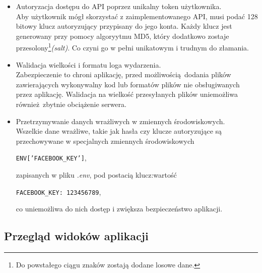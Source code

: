     \begin{itemize}
      \item Autoryzacja dostępu do API poprzez unikalny token użytkownika.\\
      Aby użytkownik mógł skorzystać z zaimplementowanego API, musi podać 128 bitowy klucz autoryzujący przypisany do jego konta. Każdy klucz jest generowany przy pomocy algoryytmu MD5, który dodatkowo zostaje przesolony\footnote{Do powstałego ciągu znaków zostają dodane losowe dane.}\emph{(salt)}. Co czyni go w pełni unikatowym i trudnym do złamania.

      \item Walidacja wielkości i formatu loga wydarzenia.\\
      Zabezpieczenie to chroni aplikację, przed możliwością dodania plików zawierających wykonywalny kod lub formatów plików nie obsługiwanych przez aplikację. Walidacja na wielkość przesyłanych plików uniemożliwa również zbytnie obciążenie serwera.
      \item Przetrzymywanie danych wrażliwych w zmiennych środowiskowych.\\
      Wszelkie dane wrażliwe, takie jak hasła czy klucze autoryzujące są przechowywane w specjalnych zmiennych środowiskowych
      \begin{center}
        \texttt{ENV['FACEBOOK\_KEY']},
      \end{center}
      zapisanych w pliku \emph{.env}, pod postacią klucz:wartość
      \begin{center}
        \texttt{FACEBOOK\_KEY: 123456789},
      \end{center}
      co uniemożliwa do nich dostęp i zwiększa bezpieczeństwo aplikacji.
    \end{itemize}
    \subsection{Przegląd widoków aplikacji}
